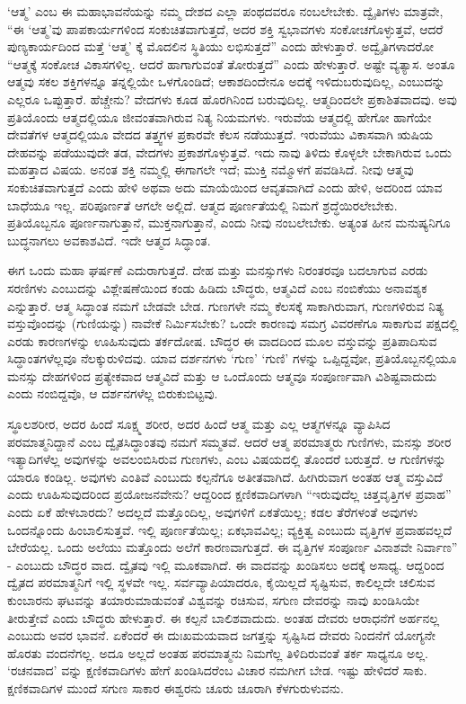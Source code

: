 ‘ಆತ್ಮ’ ಎಂಬ ಈ ಮಹಾಭಾವನೆಯನ್ನು ನಮ್ಮ ದೇಶದ ಎಲ್ಲಾ ಪಂಥದವರೂ ನಂಬಲೇಬೇಕು. ದ್ವೈತಿಗಳು ಮಾತ್ರವೇ, “ಈ ‘ಆತ್ಮ’ವು ಪಾಪಕಾರ್ಯಗಳಿಂದ ಸಂಕುಚಿತವಾಗುತ್ತದೆ, ಅದರ ಶಕ್ತಿ ಸ್ವಭಾವಗಳು ಸಂಕೋಚಗೊಳ್ಳುತ್ತವೆ, ಆದರೆ ಪುಣ್ಯಕಾರ್ಯದಿಂದ ಮತ್ತೆ ‘ಆತ್ಮ’ ಕ್ಕೆ ಮೊದಲಿನ ಸ್ಥಿತಿಯು ಲಭಿಸುತ್ತದೆ” ಎಂದು ಹೇಳುತ್ತಾರೆ. ಅದ್ವೈತಿಗಳಾದರೋ “ಆತ್ಮಕ್ಕೆ ಸಂಕೋಚ ವಿಕಾಸಗಳಿಲ್ಲ. ಆದರೆ ಹಾಗಾಗುವಂತೆ ತೋರುತ್ತದೆ” ಎಂದು ಹೇಳುತ್ತಾರೆ. ಅಷ್ಟೇ ವ್ಯತ್ಯಾಸ. ಅಂತೂ ಆತ್ಮವು ಸಕಲ ಶಕ್ತಿಗಳನ್ನೂ ತನ್ನಲ್ಲಿಯೇ ಒಳಗೊಂಡಿದೆ; ಆಕಾಶದಿಂದೇನೂ ಅದಕ್ಕೆ ಇಳಿದುಬರುವುದಿಲ್ಲ, ಎಂಬುದನ್ನು ಎಲ್ಲರೂ ಒಪ್ಪುತ್ತಾರೆ. ಹೆಚ್ಚೇನು? ವೇದಗಳು ಕೂಡ ಹೊರಗಿನಿಂದ ಬರುವುದಿಲ್ಲ. ಆತ್ಮದಿಂದಲೇ ಪ್ರಕಾಶಿತವಾದವು. ಅವು ಪ್ರತಿಯೊಂದು ಆತ್ಮದಲ್ಲಿಯೂ ಜೀವಂತವಾಗಿರುವ ನಿತ್ಯ ನಿಯಮಗಳು. ಇರುವೆಯ ಆತ್ಮದಲ್ಲಿ ಹೇಗೋ ಹಾಗೆಯೇ ದೇವತೆಗಳ ಆತ್ಮದಲ್ಲಿಯೂ ವೇದದ ತತ್ತ್ವಗಳ ಪ್ರಕಾರವೇ ಕೆಲಸ ನಡೆಯುತ್ತದೆ. ಇರುವೆಯು ವಿಕಾಸವಾಗಿ ಋಷಿಯ ದೇಹವನ್ನು ಪಡೆಯುವುದೇ ತಡ, ವೇದಗಳು ಪ್ರಕಾಶಗೊಳ್ಳುತ್ತವೆ. ಇದು ನಾವು ತಿಳಿದು ಕೊಳ್ಳಲೇ ಬೇಕಾಗಿರುವ ಒಂದು ಮಹತ್ತಾದ ವಿಷಯ. ಅನಂತ ಶಕ್ತಿ ನಮ್ಮಲ್ಲಿ ಈಗಾಗಲೇ ಇದೆ; ಮುಕ್ತಿ ನಮ್ಮೊಳಗೆ ಪವಡಿಸಿದೆ. ನೀವು ಆತ್ಮವು ಸಂಕುಚಿತವಾಗುತ್ತದೆ ಎಂದು ಹೇಳಿ ಅಥವಾ ಅದು ಮಾಯೆಯಿಂದ ಆವೃತವಾಗಿದೆ ಎಂದು ಹೇಳಿ, ಅದರಿಂದ ಯಾವ ಬಾಧೆಯೂ ಇಲ್ಲ. ಪರಿಪೂರ್ಣತೆ ಆಗಲೇ ಅಲ್ಲಿದೆ. ಆತ್ಮದ ಪೂರ್ಣತೆಯಲ್ಲಿ ನಿಮಗೆ ಶ್ರದ್ಧೆಯಿರಲೇಬೇಕು. ಪ್ರತಿಯೊಬ್ಬನೂ ಪೂರ್ಣನಾಗುತ್ತಾನೆ, ಮುಕ್ತನಾಗುತ್ತಾನೆ, ಎಂದು ನೀವು ನಂಬಲೇಬೇಕು. ಅತ್ಯಂತ ಹೀನ ಮನುಷ್ಯನಿಗೂ ಬುದ್ಧನಾಗಲು ಅವಕಾಶವಿದೆ. ಇದೇ ಆತ್ಮದ ಸಿದ್ಧಾಂತ.

ಈಗ ಒಂದು ಮಹಾ ಘರ್ಷಣೆ ಎದುರಾಗುತ್ತದೆ. ದೇಹ ಮತ್ತು ಮನಸ್ಸುಗಳು ನಿರಂತರವೂ ಬದಲಾಗುವ ಎರಡು ಸರಣಿಗಳು ಎಂಬುದನ್ನು ವಿಶ್ಲೇಷಣೆಯಿಂದ ಕಂಡು ಹಿಡಿದು ಬೌದ್ಧರು, ಆತ್ಮವಿದೆ ಎಂಬ ನಂಬಿಕೆಯು ಅನಾವಶ್ಯಕ ಎನ್ನುತ್ತಾರೆ. ಆತ್ಮ ಸಿದ್ಧಾಂತ ನಮಗೆ ಬೇಡವೇ ಬೇಡ. ಗುಣಗಳೇ ನಮ್ಮ ಕೆಲಸಕ್ಕೆ ಸಾಕಾಗಿರುವಾಗ, ಗುಣಗಳಿರುವ ನಿತ್ಯ ವಸ್ತುವೊಂದನ್ನು (ಗುಣಿಯನ್ನು) ನಾವೇಕೆ ನಿರ್ಮಿಸಬೇಕು? ಒಂದೇ ಕಾರಣವು ಸಮಗ್ರ ವಿವರಣೆಗೂ ಸಾಕಾಗುವ ಪಕ್ಷದಲ್ಲಿ ಎರಡು ಕಾರಣಗಳನ್ನು ಊಹಿಸುವುದು ತರ್ಕದೋಷ. ಬೌದ್ಧರ ಈ ವಾದದಿಂದ ಮೂಲ ವಸ್ತುವನ್ನು ಪ್ರತಿಪಾದಿಸುವ ಸಿದ್ಧಾಂತಗಳೆಲ್ಲವೂ ನೆಲಕ್ಕುರುಳಿದವು. ಯಾವ ದರ್ಶನಗಳು ‘ಗುಣ’ ‘ಗುಣಿ’ ಗಳನ್ನು ಒಪ್ಪಿದ್ದವೋ, ಪ್ರತಿಯೊಬ್ಬನಲ್ಲಿಯೂ ಮನಸ್ಸು ದೇಹಗಳಿಂದ ಪ್ರತ್ಯೇಕವಾದ ಆತ್ಮವಿದೆ ಮತ್ತು ಆ ಒಂದೊಂದು ಆತ್ಮವೂ ಸಂಪೂರ್ಣವಾಗಿ ವಿಶಿಷ್ಟವಾದುದು ಎಂದು ನಂಬಿದ್ದವೊ, ಆ ದರ್ಶನಗಳೆಲ್ಲ ಬಿರುಕುಬಿಟ್ಟವು.

ಸ್ಥೂಲಶರೀರ, ಅದರ ಹಿಂದೆ ಸೂಕ್ಷ್ಮ ಶರೀರ, ಅದರ ಹಿಂದೆ ಆತ್ಮ ಮತ್ತು ಎಲ್ಲ ಆತ್ಮಗಳನ್ನೂ ವ್ಯಾಪಿಸಿದ ಪರಮಾತ್ಮನಿದ್ದಾನೆ ಎಂಬ ದ್ವೈತಸಿದ್ಧಾಂತವು ನಮಗೆ ಸಮ್ಮತವೆ. ಆದರೆ ಆತ್ಮ ಪರಮಾತ್ಮರು ಗುಣಿಗಳು, ಮನಸ್ಸು ಶರೀರ ಇತ್ಯಾದಿಗಳೆಲ್ಲ ಅವುಗಳನ್ನು ಅವಲಂಬಿಸಿರುವ ಗುಣಗಳು, ಎಂಬ ವಿಷಯದಲ್ಲಿ ತೊಂದರೆ ಬರುತ್ತದೆ. ಆ ಗುಣಿಗಳನ್ನು ಯಾರೂ ಕಂಡಿಲ್ಲ. ಅವುಗಳು ಎಂತಿವೆ ಎಂಬುದು ಕಲ್ಪನೆಗೂ ಅತೀತವಾಗಿದೆ. ಹೀಗಿರುವಾಗ ಅಂತಹ ಆತ್ಮ ವಸ್ತುವಿದೆ ಎಂದು ಊಹಿಸುವುದರಿಂದ ಪ್ರಯೋಜನವೇನು? ಆದ್ದರಿಂದ ಕ್ಷಣಿಕವಾದಿಗಳಾಗಿ “ಇರುವುದೆಲ್ಲ ಚಿತ್ತವೃತ್ತಿಗಳ ಪ್ರವಾಹ” ಎಂದು ಏಕೆ ಹೇಳಬಾರದು? ಅದಲ್ಲದೆ ಮತ್ತೊಂದಿಲ್ಲ, ಅವುಗಳಿಗೆ ಏಕತೆಯಿಲ್ಲ; ಕಡಲ ತೆರೆಗಳಂತೆ ಅವುಗಳು ಒಂದನ್ನೊಂದು ಹಿಂಬಾಲಿಸುತ್ತವೆ. ಇಲ್ಲಿ ಪೂರ್ಣತೆಯಿಲ್ಲ; ಏಕಭಾವವಿಲ್ಲ; ವ್ಯಕ್ತಿತ್ವ ಎಂಬುದು ವೃತ್ತಿಗಳ ಪ್ರವಾಹವಲ್ಲದೆ ಬೇರೆಯಲ್ಲ. ಒಂದು ಅಲೆಯು ಮತ್ತೊಂದು ಅಲೆಗೆ ಕಾರಣವಾಗುತ್ತದೆ. ಈ ವೃತ್ತಿಗಳ ಸಂಪೂರ್ಣ ವಿನಾಶವೇ ನಿರ್ವಾಣ” - ಎಂಬುದು ಬೌದ್ಧರ ವಾದ. ದ್ವೈತವು ಇಲ್ಲಿ ಮೂಕವಾಗಿದೆ. ಈ ವಾದವನ್ನು ಖಂಡಿಸಲು ಅದಕ್ಕೆ ಅಸಾಧ್ಯ. ಆದ್ದರಿಂದ ದ್ವೈತದ ಪರಮಾತ್ಮನಿಗೆ ಇಲ್ಲಿ ಸ್ಥಳವೇ ಇಲ್ಲ. ಸರ್ವವ್ಯಾಪಿಯಾದರೂ, ಕೈಯಿಲ್ಲದೆ ಸೃಷ್ಟಿಸುವ, ಕಾಲಿಲ್ಲದೇ ಚಲಿಸುವ ಕುಂಬಾರನು ಘಟವನ್ನು ತಯಾರುಮಾಡುವಂತೆ ವಿಶ್ವವನ್ನು ರಚಿಸುವ, ಸಗುಣ ದೇವರನ್ನು ನಾವು ಖಂಡಿಸಿಯೇ ತೀರುತ್ತೇವೆ ಎಂದು ಬೌದ್ಧರು ಹೇಳುತ್ತಾರೆ. ಈ ಕಲ್ಪನೆ ಬಾಲಿಶವಾದುದು. ಅಂತಹ ದೇವರು ಆರಾಧನೆಗೆ ಅರ್ಹನಲ್ಲ ಎಂಬುದು ಅವರ ಭಾವನೆ. ಏಕೆಂದರೆ ಈ ದುಃಖಮಯವಾದ ಜಗತ್ತನ್ನು ಸೃಷ್ಟಿಸಿದ ದೇವರು ನಿಂದನೆಗೆ ಯೋಗ್ಯನೇ ಹೊರತು ವಂದನೆಗಲ್ಲ. ಅದೂ ಅಲ್ಲದೆ ಅಂತಹ ಪರಮಾತ್ಮನು ನಿಮಗೆಲ್ಲ ತಿಳಿದಿರುವಂತೆ ತರ್ಕ ಸಾಧ್ಯನೂ ಅಲ್ಲ. ‘ರಚನವಾದ’  ವನ್ನು ಕ್ಷಣಿಕವಾದಿಗಳು ಹೇಗೆ ಖಂಡಿಸಿದರೆಂಬ ವಿಚಾರ ನಮಗೀಗ ಬೇಡ. ಇಷ್ಟು ಹೇಳಿದರೆ ಸಾಕು. ಕ್ಷಣಿಕವಾದಿಗಳ ಮುಂದೆ ಸಗುಣ ಸಾಕಾರ ಈಶ್ವರನು ಚೂರು ಚೂರಾಗಿ ಕೆಳಗುರುಳುವನು.

